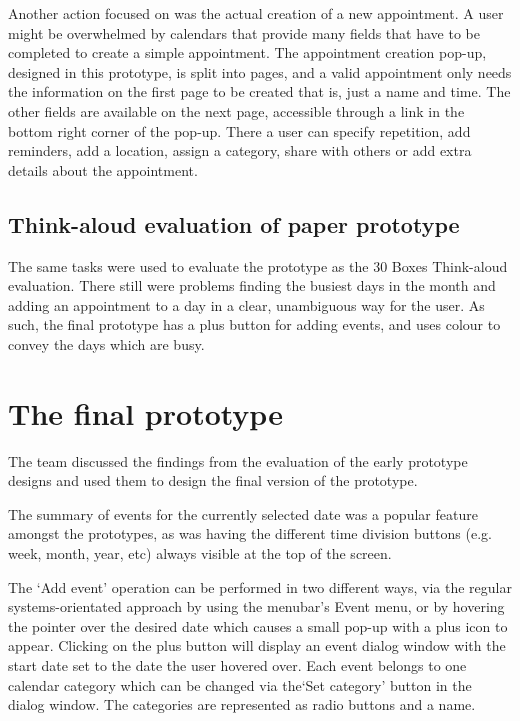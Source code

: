 \documentclass{article}
\begin{document}
Another action focused on was the actual creation of a new
appointment. A user might be overwhelmed by calendars that provide many
fields that have to be completed to create a simple appointment.
The appointment creation pop-up, designed in this prototype, is split
into pages, and a valid appointment only needs the information on the
first page to be created that is, just a name and time. The other
fields are available on the next page, accessible through a link in the
bottom right corner of the pop-up. There a user can specify repetition,
add reminders, add a location, assign a category, share with others or
add extra details about the appointment.

\subsection{Think-aloud evaluation of paper prototype}

The same tasks were used to evaluate the prototype as the 30 Boxes
Think-aloud evaluation. There still were problems finding the
busiest days in the month and adding an appointment to a day in a
clear, unambiguous way for the user. As such, the final prototype has a
plus button for adding events, and uses colour to convey the days which
are busy.


\section{The final prototype}

The team discussed the findings from the evaluation of the early
prototype designs and used them to design the final version of the
prototype.

The summary of events for the currently selected date was a popular
feature amongst the prototypes, as was having the different time
division buttons (e.g. week, month, year, etc) always visible at the
top of the screen.

The `Add event' operation can be performed in two different ways, via
the regular systems-orientated approach by using the menubar's Event
menu, or by hovering the pointer over the desired date which causes a
small pop-up with a plus icon to appear. Clicking on the plus button
will display an event dialog window with the start date set to the
date the user hovered over. Each event belongs to one calendar category
which can be changed via the`Set category' button in the dialog window.
The categories are represented as radio buttons and a name.
\end{document}
